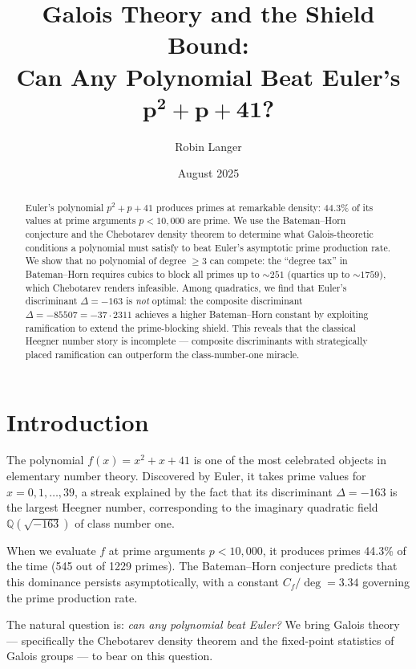 \documentclass[11pt,a4paper]{article}
\title{Galois Theory and the Shield Bound:\\Can Any Polynomial Beat Euler's $\boldsymbol{p^2+p+41}$?}
\author{Robin Langer}
\date{August 2025}
\theoremstyle{definition}
\theoremstyle{remark}
\newcommand{\Q}{\mathbb{Q}}
\begin{document}
\maketitle

\begin{abstract}
Euler's polynomial $p^2+p+41$ produces primes at remarkable density: 44.3\% of its values at prime arguments $p < 10{,}000$ are prime.
We use the Bateman--Horn conjecture and the Chebotarev density theorem to determine what Galois-theoretic conditions a polynomial must satisfy to beat Euler's asymptotic prime production rate.
We show that no polynomial of degree $\geq 3$ can compete: the ``degree tax'' in Bateman--Horn requires cubics to block all primes up to $\sim\!251$ (quartics up to $\sim\!1759$), which Chebotarev renders infeasible.
Among quadratics, we find that Euler's discriminant $\Delta = -163$ is \emph{not} optimal: the composite discriminant $\Delta = -85507 = -37 \cdot 2311$ achieves a higher Bateman--Horn constant by exploiting ramification to extend the prime-blocking shield.
This reveals that the classical Heegner number story is incomplete --- composite discriminants with strategically placed ramification can outperform the class-number-one miracle.
\end{abstract}

\tableofcontents

\section{Introduction}\label{sec:intro}

The polynomial $f(x) = x^2 + x + 41$ is one of the most celebrated objects in elementary number theory.
Discovered by Euler, it takes prime values for $x = 0, 1, \ldots, 39$, a streak explained by the fact that its discriminant $\Delta = -163$ is the largest Heegner number, corresponding to the imaginary quadratic field $\Q(\sqrt{-163})$ of class number one.

When we evaluate $f$ at prime arguments $p < 10{,}000$, it produces primes 44.3\% of the time (545 out of 1229 primes).
The Bateman--Horn conjecture predicts that this dominance persists asymptotically, with a constant $C_f/\deg = 3.34$ governing the prime production rate.

The natural question is: \emph{can any polynomial beat Euler?}
We bring Galois theory --- specifically the Chebotarev density theorem and the fixed-point statistics of Galois groups --- to bear on this question.
\end{document}
